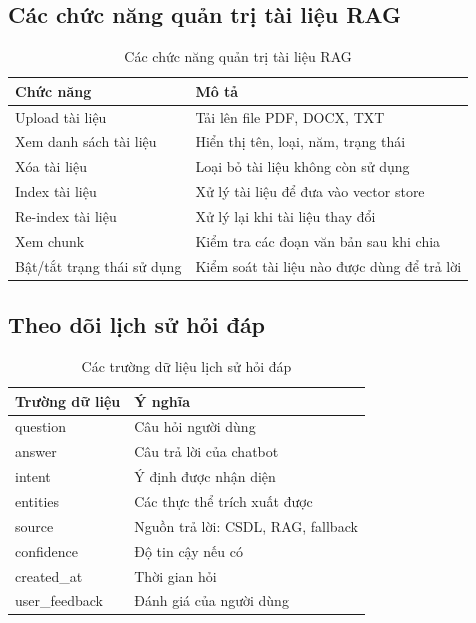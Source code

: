 \subsection{Các chức năng quản trị tài liệu RAG}
\begin{table}[H]
\centering
\caption{Các chức năng quản trị tài liệu RAG}
\label{tab:admin_rag_functions}
\begin{tabular}{|p{4cm}|p{8cm}|}
\hline
\textbf{Chức năng} & \textbf{Mô tả} \\ \hline
Upload tài liệu & Tải lên file PDF, DOCX, TXT \\ \hline
Xem danh sách tài liệu & Hiển thị tên, loại, năm, trạng thái \\ \hline
Xóa tài liệu & Loại bỏ tài liệu không còn sử dụng \\ \hline
Index tài liệu & Xử lý tài liệu để đưa vào vector store \\ \hline
Re-index tài liệu & Xử lý lại khi tài liệu thay đổi \\ \hline
Xem chunk & Kiểm tra các đoạn văn bản sau khi chia \\ \hline
Bật/tắt trạng thái sử dụng & Kiểm soát tài liệu nào được dùng để trả lời \\ \hline
\end{tabular}
\end{table}

\subsection{Theo dõi lịch sử hỏi đáp}
\begin{table}[H]
\centering
\caption{Các trường dữ liệu lịch sử hỏi đáp}
\label{tab:qa_history_fields}
\begin{tabular}{|p{3.6cm}|p{8.4cm}|}
\hline
\textbf{Trường dữ liệu} & \textbf{Ý nghĩa} \\ \hline
question & Câu hỏi người dùng \\ \hline
answer & Câu trả lời của chatbot \\ \hline
intent & Ý định được nhận diện \\ \hline
entities & Các thực thể trích xuất được \\ \hline
source & Nguồn trả lời: CSDL, RAG, fallback \\ \hline
confidence & Độ tin cậy nếu có \\ \hline
created\_at & Thời gian hỏi \\ \hline
user\_feedback & Đánh giá của người dùng \\ \hline
\end{tabular}
\end{table}

